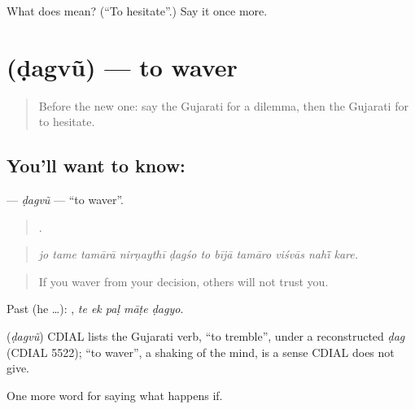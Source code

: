 \begin{tcolorbox}[breakable,colback=teal!4,colframe=teal!35!black,title={Before you move on}]
What does  mean? (\textquotedblleft{}To hesitate\textquotedblright{}.) Say it once more.
\end{tcolorbox}
\section[\texorpdfstring{\gu{ડગવું} (ḍagvũ)}{ડગવું (ḍagvũ)}]{ (ḍagvũ) — to waver}

\label{lesson:GU-C389-dagvu}



\begin{quote}
Before the new one: say the Gujarati for a dilemma, then the Gujarati for to hesitate.
\end{quote}

\subsection*{You'll want to know: }
\textbf{} — \emph{ḍagvũ} — \textquotedblleft{}to waver\textquotedblright{}.

\begin{quote}
          .
\end{quote}

\begin{quote}
\emph{jo tame tamārā nirṇaythī ḍagśo to bījā tamāro viśvās nahī̃ kare.}
\end{quote}

\begin{quote}
If you waver from your decision, others will not trust you.
\end{quote}

Past (he …):     , \emph{te ek paḷ māṭe ḍagyo}.

\begin{cousinweb}
\textbf{} (\emph{ḍagvũ}) CDIAL lists the Gujarati verb, \textquotedblleft{}to tremble\textquotedblright{}, under a reconstructed \emph{ḍag} (CDIAL 5522); \textquotedblleft{}to waver\textquotedblright{}, a shaking of the mind, is a sense CDIAL does not give.
\end{cousinweb}

\begin{grammarlens}[title={What you've built}]
One more word for saying what happens if.
\end{grammarlens}


